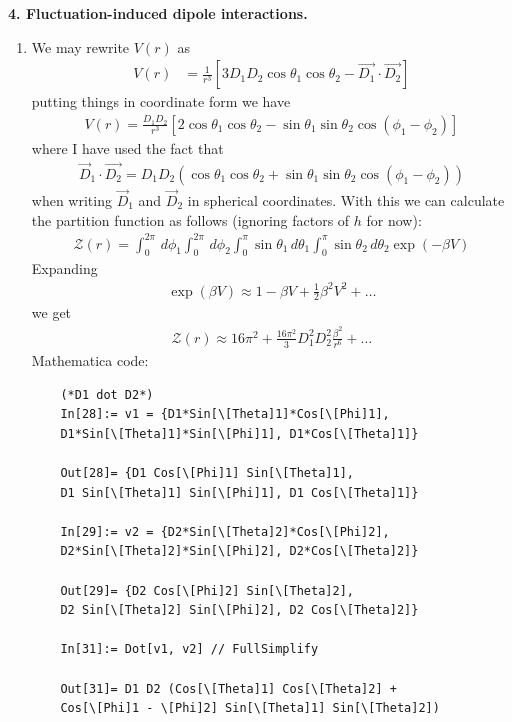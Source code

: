 \documentclass{article}
\theoremstyle{definition}
\newcommand{\be}{\beta}
\newcommand{\f}[2]{\frac{#1}{#2}}
\newcommand{\lb}{\left[}
\newcommand{\rb}{\right]}
\begin{document}
\noindent \textbf{4. Fluctuation-induced dipole interactions.}

\begin{enumerate}[label=(\alph*)]
	\item We may rewrite $V(r)$ as 
	\begin{align*} 
	V(r) 
	&= \f{1}{r^3} \lb 3D_1 D_2 \cos\theta_1 \cos\theta_2  - \vec{D_1} \cdot \vec{D_2} \rb
 	\end{align*}
 	putting things in coordinate form we have
 	\begin{align*}
 	V(r) = \f{D_1 D_2}{r^3}\lb 2\cos\theta_1 \cos\theta_2 - \sin\theta_1\sin\theta_2\cos(\phi_1 - \phi_2) \rb
 	\end{align*}
 	where I have used the fact that
 	\begin{align*}
 	\vec{D}_1 \cdot \vec{D_2} = D_1D_2 (\cos\theta_1\cos\theta_2 + \sin\theta_1\sin\theta_2\cos(\phi_1-\phi_2))
 	\end{align*}
 	when writing $\vec{D}_1$ and $\vec{D}_2$ in spherical coordinates.  With this we can calculate the partition function as follows (ignoring factors of $h$ for now):
 	\begin{align*}
	\mathcal{Z}(r) = \int_0^{2\pi}\,d\phi_1 \int_0^{2\pi}\,d\phi_2 \int_0^\pi \sin\theta_1 \, d\theta_1 \int_0^\pi \sin\theta_2\, d\theta_2 \exp(-\be V) 
	\end{align*}
	Expanding 
	\begin{align*}
	\exp(\be V) \approx 1 - \be V + \f{1}{2}\be^2 V^2 + \dots 
	\end{align*}
	we get
	\begin{align*}
	\boxed{\mathcal{Z}(r) \approx 16\pi^2 + \f{16\pi^2}{3}D_1^2D_2^2 \f{\beta^2}{r^6} + \dots}
	\end{align*}
	Mathematica code:
	\begin{lstlisting}
	(*D1 dot D2*)
	In[28]:= v1 = {D1*Sin[\[Theta]1]*Cos[\[Phi]1], 
	D1*Sin[\[Theta]1]*Sin[\[Phi]1], D1*Cos[\[Theta]1]}
	
	Out[28]= {D1 Cos[\[Phi]1] Sin[\[Theta]1], 
	D1 Sin[\[Theta]1] Sin[\[Phi]1], D1 Cos[\[Theta]1]}
	
	In[29]:= v2 = {D2*Sin[\[Theta]2]*Cos[\[Phi]2], 
	D2*Sin[\[Theta]2]*Sin[\[Phi]2], D2*Cos[\[Theta]2]}
	
	Out[29]= {D2 Cos[\[Phi]2] Sin[\[Theta]2], 
	D2 Sin[\[Theta]2] Sin[\[Phi]2], D2 Cos[\[Theta]2]}
	
	In[31]:= Dot[v1, v2] // FullSimplify
	
	Out[31]= D1 D2 (Cos[\[Theta]1] Cos[\[Theta]2] + 
	Cos[\[Phi]1 - \[Phi]2] Sin[\[Theta]1] Sin[\[Theta]2])
	

\end{lstlisting}
\end{enumerate}
\end{document}
